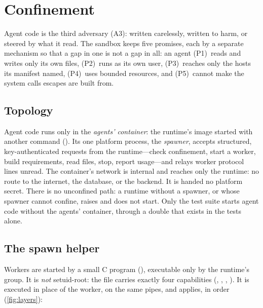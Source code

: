 \section{Confinement}
\label{sec:sandbox}

Agent code is the third adversary (A3): written carelessly, written to
harm, or steered by what it read. The sandbox keeps five promises, each
by a separate mechanism so that a gap in one is not a gap in all: an
agent (P1)~reads and writes only its own files, (P2)~runs as its own
user, (P3)~reaches only the hosts its manifest named, (P4)~uses bounded
resources, and (P5)~cannot make the system calls escapes are built
from.

\subsection{Topology}

Agent code runs only in the \emph{agents' container}: the runtime's
image started with another command ().
Its one platform process, the \emph{spawner}, accepts structured,
key-authenticated requests from the runtime---check confinement,
start a worker, build requirements, read files, stop, report usage---and
relays worker protocol lines unread. The
container's network is internal and reaches only the runtime: no route
to the internet, the database, or the backend. It is handed no platform
secret. There is no unconfined path: a runtime without a spawner, or
whose spawner cannot confine, raises  and does
not start. Only the test suite starts agent code without the agents'
container, through a double that exists in the tests alone.

\subsection{The spawn helper}

Workers are started by a small C program
(), executable only
by the runtime's group. It is \emph{not} setuid-root: the file carries
exactly four capabilities (, ,
, ). It is executed in place of the
worker, on the same pipes, and applies, in order (\cref{fig:layers}):


